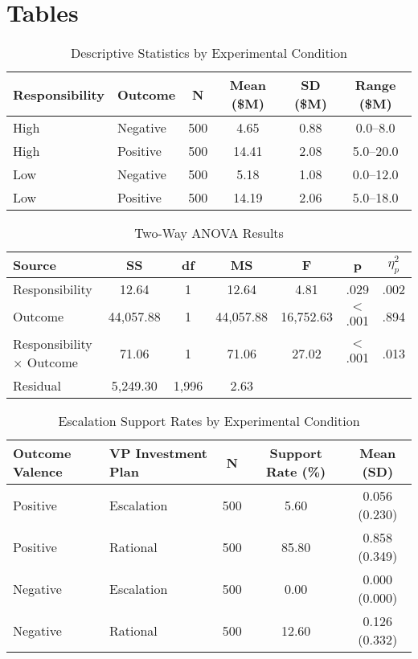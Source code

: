 \documentclass[letterpaper]{article} %
\begin{document}
\newpage



% 

\newpage
\appendix
\section{Tables}

\begin{table*}[t]
\centering
\caption{Descriptive Statistics by Experimental Condition}
\label{tab:table-1}
\begin{tabular}{llcccc}
\hline
Responsibility & Outcome & N & Mean (\$M) & SD (\$M) & Range (\$M) \\
\hline
High & Negative & 500 & 4.65 & 0.88 & 0.0--8.0 \\
High & Positive & 500 & 14.41 & 2.08 & 5.0--20.0 \\
Low & Negative & 500 & 5.18 & 1.08 & 0.0--12.0 \\
Low & Positive & 500 & 14.19 & 2.06 & 5.0--18.0 \\
\hline
\end{tabular}
\end{table*}


\begin{table*}[t]
\centering
\caption{Two-Way ANOVA Results}
\label{tab:anova}
\begin{tabular}{lcccccc}
\hline
Source & SS & df & MS & F & p & $\eta_p^2$ \\
\hline
Responsibility & 12.64 & 1 & 12.64 & 4.81 & .029 & .002 \\
Outcome & 44,057.88 & 1 & 44,057.88 & 16,752.63 & $<$.001 & .894 \\
Responsibility × Outcome & 71.06 & 1 & 71.06 & 27.02 & $<$.001 & .013 \\
Residual & 5,249.30 & 1,996 & 2.63 & & & \\
\hline
\end{tabular}
\end{table*}


\begin{table*}[t]
\centering
\caption{Escalation Support Rates by Experimental Condition}
\label{tab:study2_descriptives}
\begin{tabular}{llccc}
\hline
Outcome Valence & VP Investment Plan & N & Support Rate (\%) & Mean (SD) \\
\hline
Positive & Escalation & 500 & 5.60 & 0.056 (0.230) \\
Positive & Rational & 500 & 85.80 & 0.858 (0.349) \\
Negative & Escalation & 500 & 0.00 & 0.000 (0.000) \\
Negative & Rational & 500 & 12.60 & 0.126 (0.332) \\
\hline
\end{tabular}
\end{table*}
\end{document}
